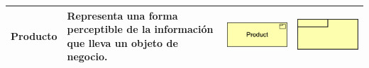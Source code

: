 \begin{longtable}{|p{0.15\linewidth}|p{0.45\linewidth}|p{0.2\linewidth} p{0.2\linewidth}|}
    Producto
    &
    Representa una forma perceptible de la información que lleva un objeto de negocio.
    &
\begin{center}
    \includegraphics[width=1\linewidth]{imgs/capa_de_negocios/13.pdf}
\end{center} &
\begin{center}
    \includegraphics[width=0.5\linewidth]{imgs/capa_de_negocios/a13.pdf}
\end{center}
    \\ \hline


\end{longtable}